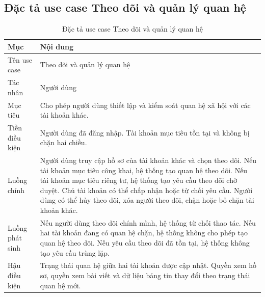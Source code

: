 \documentclass[../DoAn.tex]{subfiles}
\begin{document}
\subsection{Đặc tả use case Theo dõi và quản lý quan hệ}
\label{subsection:2.3.4}
\begin{table}[H]
\centering
\caption{Đặc tả use case Theo dõi và quản lý quan hệ}
\label{table:uc-relations}
\begin{tabular}{|p{3.5cm}|p{9.5cm}|}
\hline
\textbf{Mục} & \textbf{Nội dung} \\
\hline
Tên use case & Theo dõi và quản lý quan hệ \\
\hline
Tác nhân & Người dùng \\
\hline
Mục tiêu & Cho phép người dùng thiết lập và kiểm soát quan hệ xã hội với các tài khoản khác. \\
\hline
Tiền điều kiện & Người dùng đã đăng nhập. Tài khoản mục tiêu tồn tại và không bị chặn hai chiều. \\
\hline
Luồng chính & Người dùng truy cập hồ sơ của tài khoản khác và chọn theo dõi. Nếu tài khoản mục tiêu công khai, hệ thống tạo quan hệ theo dõi. Nếu tài khoản mục tiêu riêng tư, hệ thống tạo yêu cầu theo dõi chờ duyệt. Chủ tài khoản có thể chấp nhận hoặc từ chối yêu cầu. Người dùng có thể hủy theo dõi, xóa người theo dõi, chặn hoặc bỏ chặn tài khoản khác. \\
\hline
Luồng phát sinh & Nếu người dùng theo dõi chính mình, hệ thống từ chối thao tác. Nếu hai tài khoản đang có quan hệ chặn, hệ thống không cho phép tạo quan hệ theo dõi. Nếu yêu cầu theo dõi đã tồn tại, hệ thống không tạo yêu cầu trùng lặp. \\
\hline
Hậu điều kiện & Trạng thái quan hệ giữa hai tài khoản được cập nhật. Quyền xem hồ sơ, quyền xem bài viết và dữ liệu bảng tin thay đổi theo trạng thái quan hệ mới. \\
\hline
\end{tabular}
\end{table}
\end{document}
